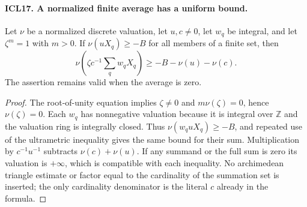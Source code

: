 \paragraph{ICL17. A normalized finite average has a uniform bound.}
\label{claim:ICL17}
Let \(\nu\) be a normalized discrete valuation, let
\(u,c\ne0\), let \(w_q\) be integral, and let
\(\zeta^m=1\) with \(m>0\).  If
\(\nu(uX_q)\geq-B\) for all members of a finite set,
then
\[
 \nu\left(\zeta c^{-1}\sum_qw_qX_q\right)
                 \geq-B-\nu(u)-\nu(c).                \tag{ICL.16}
\]
The assertion remains valid when the average is zero.
\begin{proof}
The root-of-unity equation implies \(\zeta\ne0\) and
\(m\nu(\zeta)=0\), hence \(\nu(\zeta)=0\).
Each \(w_q\) has nonnegative valuation because it is
integral over \(\mathbb Z\) and the valuation ring is
integrally closed.  Thus
\(\nu(w_quX_q)\geq-B\), and repeated use of the
ultrametric inequality gives the same bound for their
sum.  Multiplication by \(c^{-1}u^{-1}\) subtracts
\(\nu(c)+\nu(u)\).  If any summand or the full sum
is zero its valuation is \(+\infty\), which is
compatible with each inequality.  No archimedean
triangle estimate or factor equal to the cardinality
of the summation set is inserted; the only cardinality
denominator is the literal \(c\) already in the formula.
\end{proof}

